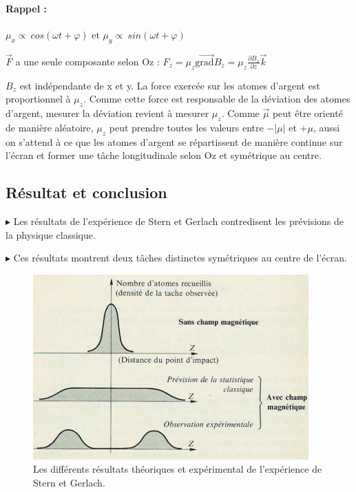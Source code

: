 \documentclass[12pt,a4paper,titlepage]{book}
\begin{document}
\paragraph*{Rappel :}

$\mu_x \propto ~cos(\omega t + \varphi)$ et $\mu_y \propto ~sin(\omega t + \varphi)$

$\overrightarrow{F}$ a une seule composante selon Oz : $F_z = \mu_z \overrightarrow{\text{grad}} B_z = \mu_z \frac{\partial B_z}{\partial z} \overrightarrow{k}$

$B_z$ est indépendante de x et y. La force exercée sur les atomes d'argent est proportionnel à $\mu_z$. Comme cette force est responsable de la déviation des atomes d'argent, mesurer la déviation revient à mesurer $\mu_z$. Comme $\overrightarrow{\mu}$ peut être orienté de manière aléatoire, $\mu_z$ peut prendre toutes les valeurs entre $- \vert \mu \vert$ et $+\mu$, aussi on s'attend à ce que les atomes d'argent se répartissent de manière continue sur l'écran et former une tâche longitudinale selon Oz et symétrique au centre.

\subsection{Résultat et conclusion}

$\blacktriangleright$ Les résultats de l'expérience de Stern et Gerlach contredisent les prévisions de la physique classique.

$\blacktriangleright$ Ces résultats montrent deux tâches distinctes symétriques au centre de l'écran.

\begin{figure}[!h]
\centering
\includegraphics[scale=1]{results-stern-gerlach.png}
\caption{Les différents résultats théoriques et expérimental de l'expérience de Stern et Gerlach.}
\label{fig:resultSG1}
\end{figure}
\end{document}
